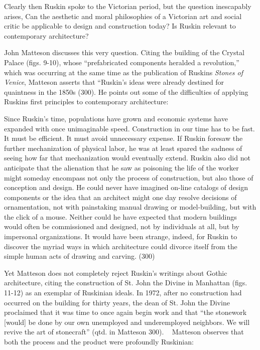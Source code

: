 {\color{black}
Clearly then Ruskin spoke to the Victorian period, but the question
inescapably arises, Can the aesthetic and moral philosophies of a
Victorian art and social critic be applicable to design and
construction today?  Is Ruskin relevant to contemporary architecture? 
}


\bigskip


\bigskip

{\color{black}
John Matteson discusses this very question.  Citing the building of the
Crystal Palace (figs. 9-10), whose “prefabricated components heralded a
revolution,” which was occurring at the same time as the publication of
Ruskin{\textquotesingle}s \textit{Stones of Venice}, Matteson asserts
that “Ruskin’s ideas were already destined for quaintness in the
1850s{\textquotedbl} (300).  He points out some of the difficulties of
applying Ruskin{\textquotesingle}s first principles to contemporary
architecture: }

{\color{black}
Since Ruskin’s time, populations have grown and economic systems have
expanded with once unimaginable speed.  Construction in our time has to
be fast.  It must be efficient.  It must avoid unnecessary expense.  If
Ruskin foresaw the further mechanization of physical labor, he was at
least spared the sadness of seeing how far that mechanization would
eventually extend.  Ruskin also did not anticipate that the alienation
that he saw as poisoning the life of the worker might someday encompass
not only the process of construction, but also those of conception and
design.  He could never have imagined on-line catalogs of design
components or the idea that an architect might one day resolve
decisions of ornamentation, not with painstaking manual drawing or
model-building, but with the click of a mouse.  Neither could he have
expected that modern buildings would often be commissioned and
designed, not by individuals at all, but by impersonal organizations. 
It would have been strange, indeed, for Ruskin to discover the myriad
ways in which architecture could divorce itself from the simple human
acts of drawing and carving.  (300) }

{\color{black}
Yet Matteson does not completely reject Ruskin’s writings about Gothic
architecture, citing the construction of St. John the Divine in
Manhattan (figs. 11-12) as an exemplar of Ruskinian ideals.  In 1972,
after no construction had occurred on the building for thirty years,
the dean of St. John the Divine proclaimed that it was time to once
again begin work and that “the stonework [would] be done by our own
unemployed and underemployed neighbors.  We will revive the art of
stonecraft” (qtd. in Matteson 300). ~ Matteson observes that both the
process and the product were {\textquotedbl}profoundly
Ruskinian{\textquotedbl}: }

